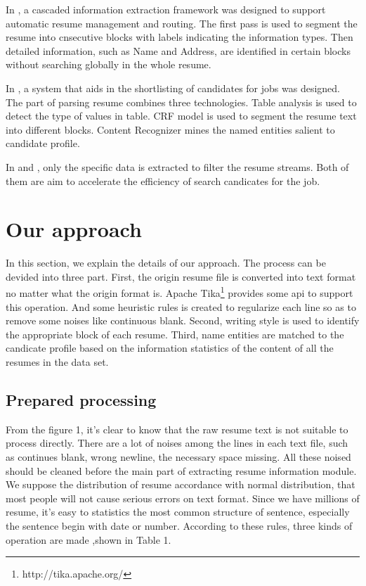 \documentclass{acm_proc_article-sp}
\begin{document}
In \cite{Yu:2005:RIE:1219840.1219902}, a cascaded information extraction framework was designed to support automatic resume management and routing.
The first pass is used to segment the resume into cnsecutive blocks with labels indicating the information types. 
Then detailed information, such as Name and Address, are identified in certain blocks without searching globally in the whole resume.

In \cite{Singh:2010:PSS:1871437.1871523}, a system that aids in the shortlisting of candidates for jobs was designed. 
The part of parsing resume combines three technologies. 
Table analysis is used to detect the type of values in table. 
CRF model is used to segment the resume text into different blocks. 
Content Recognizer mines the named entities salient to candidate profile.

In \cite{kopparapu2010automatic} and \cite{maheshwari2010approach}, only the specific data is extracted to filter the resume streams. 
Both of them are aim to accelerate the efficiency of search candicates for the job.

\section{Our approach}

In this section, we explain the details of our approach. 
The process can be devided into three part. 
First, the origin resume file is converted into text format no matter what the origin format is.
Apache Tika\footnote{http://tika.apache.org/} provides some api to support this operation.
And some heuristic rules is created to regularize each line so as to remove some noises like continuous blank. 
Second, writing style is used to identify the appropriate  block of each resume.
Third, name entities are matched to the candicate profile based on the information statistics of the content of all the resumes in the data set. 

\subsection{Prepared processing}


From the figure 1, it's clear to know that the raw resume text is not suitable to process directly. 
There are a lot of noises among the lines in each text file, such as continues blank, wrong newline, the necessary space missing. 
All these noised should be cleaned before the main part of extracting resume information module. 
We suppose the distribution of resume accordance with normal distribution, that most people will not cause serious errors on text format.
Since we have millions of resume, it's easy to statistics the most common structure of sentence, especially the sentence begin with date or number. 
According to these rules, three kinds of operation are made ,shown in Table 1.
\end{document}
